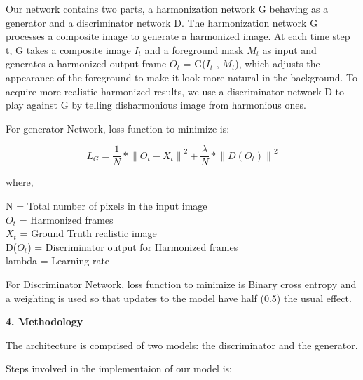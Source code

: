 \documentclass{article}
\begin{document}
Our network contains two parts, a harmonization network G behaving as a generator and a discriminator network D. The harmonization network G processes a composite image to generate a harmonized image. At each time step t, G takes a composite image $I_{t}$ and a foreground mask $M_{t}$ as input and generates a harmonized output frame $O_{t}$ = G($I_{t}$ , $M_{t}$), which adjusts the appearance of the foreground to make it look more natural in the background. To acquire more realistic harmonized results, we use a discriminator network D to play against G by telling disharmonious image from harmonious ones.

\begin{flushleft}
For generator Network, loss function to minimize is:
\end{flushleft}

\[L_G = \frac{1}{N} * {\parallel O_t - X_t \parallel}^2 + \frac{\lambda}{N} * {\parallel D(O_t) \parallel}^2 \]

\begin{flushleft}
where,\\
\end{flushleft}
N = Total number of pixels in the input image\\
$O_{t}$ = Harmonized frames\\
$X_{t}$ = Ground Truth realistic image\\
D($O_{t}$) = Discriminator output for Harmonized frames\\
lambda = Learning rate\\

\begin{flushleft}
For Discriminator Network, loss function to minimize is Binary cross entropy and a weighting is used so that updates to the model have half (0.5) the usual effect.
\end{flushleft}

\begin{center}
\end{center}

\begin{flushleft}
\textbf{\large 4. Methodology}
\end{flushleft}

The architecture is comprised of two models: the discriminator and the generator.\\

\begin{flushleft}
Steps involved in the implementaion of our model is:
\end{flushleft}
\end{document}
